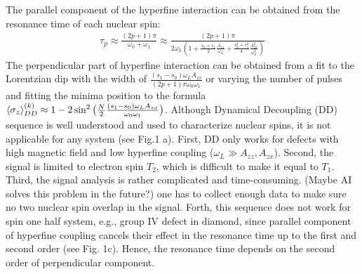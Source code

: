 \documentclass[%
 reprint,
superscriptaddress,
 amsmath,amssymb,
 aps,
]{revtex4-2}
\begin{document}
The parallel component of the hyperfine interaction can be obtained from the resonance time of each nuclear spin:
\begin{gather}
	\tau_p \approx  \frac{(2p+1) \pi}{\omega_0 + \omega_1} \approx \frac{(2p+1)\pi}{2\omega_L(1+\frac{s_0+s_1}{2} \frac{A_{zz}}{\omega_L}+ \frac{s_0^2+s_1^2}{4}\frac{A_{zx}^2}{\omega_L^2})}
\end{gather}
The perpendicular part of hyperfine interaction can be obtained from a fit to the Lorentzian dip with the width of $\frac{(s_1-s_0)\omega_L A_{zx}}{(2p+1)\pi\omega_0 \omega_1}$ or varying the number of pulses and fitting the minima position to the formula $\expval{\sigma_z}_{DD}^{(k)} \approx 1- 2 \sin^2\big(\frac{N}{2}\frac{(s_1-s_0)\omega_L A_{zx}}{\omega_0 \omega_1}\big) $. Although Dynamical Decoupling (DD) sequence is well understood and used to characterize nuclear spins, it is not applicable for any system (see Fig.1 a). First, DD only works for defects with high magnetic field and low hyperfine coupling ($\omega_L \gg A_{zz}, A_{zx}$). Second, the signal is limited to electron spin $T_2$, which is difficult to make it equal to $T_1$. Third, the signal analysis is rather complicated and time-consuming. (Maybe AI solves this problem in the future?) one has to collect enough data to make sure no two nuclear spin overlap in the signal. Forth, this sequence does not work for spin one half system, e.g., group IV defect in diamond, since parallel component of hyperfine coupling cancels their effect in the resonance time up to the first and second order (see Fig. 1c). Hence, the resonance time depends on the second order of perpendicular component. 
\end{document}
